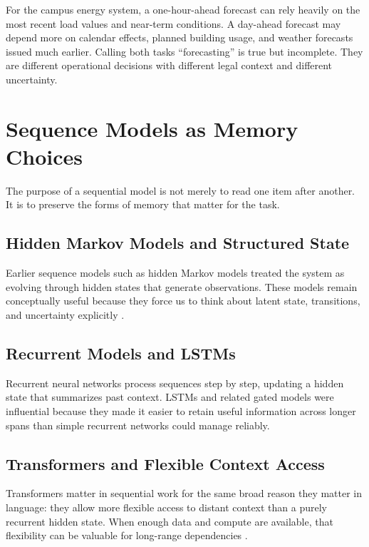 \begin{example}
For the campus energy system, a one-hour-ahead forecast can rely heavily on the most recent load values and near-term conditions. A day-ahead forecast may depend more on calendar effects, planned building usage, and weather forecasts issued much earlier. Calling both tasks ``forecasting'' is true but incomplete. They are different operational decisions with different legal context and different uncertainty.
\end{example}

\section{Sequence Models as Memory Choices}

The purpose of a sequential model is not merely to read one item after another. It is to preserve the forms of memory that matter for the task.

\subsection{Hidden Markov Models and Structured State}

Earlier sequence models such as hidden Markov models treated the system as evolving through hidden states that generate observations. These models remain conceptually useful because they force us to think about latent state, transitions, and uncertainty explicitly \citep{rabiner1989}.

\subsection{Recurrent Models and LSTMs}

Recurrent neural networks process sequences step by step, updating a hidden state that summarizes past context. LSTMs and related gated models were influential because they made it easier to retain useful information across longer spans than simple recurrent networks could manage reliably.

\subsection{Transformers and Flexible Context Access}

Transformers matter in sequential work for the same broad reason they matter in language: they allow more flexible access to distant context than a purely recurrent hidden state. When enough data and compute are available, that flexibility can be valuable for long-range dependencies \citep{vaswani2017}.

